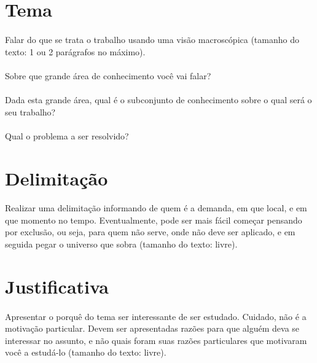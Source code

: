 \section{Tema}

\paragraph{}Falar do que se trata o trabalho usando uma visão macroscópica (tamanho do texto: 1 ou 2 parágrafos no máximo).

\paragraph{}Sobre que grande área de conhecimento você vai falar?

\paragraph{}Dada esta grande área, qual é o subconjunto de conhecimento sobre o qual será o seu trabalho?

\paragraph{}Qual o problema a ser resolvido?


\section{Delimitação}

\paragraph{}Realizar uma delimitação informando de quem é a demanda, em que local, e em que momento no tempo. Eventualmente, pode ser mais fácil começar pensando por exclusão, ou seja, para quem não serve, onde não deve ser aplicado, e em seguida pegar o universo que sobra (tamanho do texto: livre).


\section{Justificativa}

\paragraph{}Apresentar o porquê do tema ser interessante de ser estudado. Cuidado, não é a motivação particular. Devem ser apresentadas razões para que alguém deva se interessar no assunto, e não quais foram suas razões particulares que motivaram você a estudá-lo (tamanho do texto: livre).


